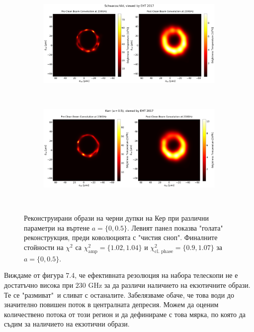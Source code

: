 \begin{figure}[h!]
	\centering
	\begin{subfigure}{12cm}
		\hspace{-1.5cm}
		\includegraphics[scale = 0.23]{Ehtim_plot_2017_no_blur_Sch.png}
	\end{subfigure}\\
	\begin{subfigure}{12cm}
		\hspace{-1.5cm}
		\includegraphics[scale = 0.23]{Ehtim_plot_2017_no_blur_Kerr.png}
	\end{subfigure}\\
	\label{Kerr_EHT_2017}
	\caption[Реконструирани образи на черни дупки на Кер при различни параметри на въртене от EHT 2017.]{\small Реконструирани образи на черни дупки на Кер при различни параметри на въртене $a = \{0, 0.5\}$. Левият панел показва "голата"$\,$ реконструкция, преди коволюцията с "чистия сноп". Финалните стойности на $\chi^2$ са $\chi^2_\text{amp} = \{1.02, 1.04\}$ и $\chi^2_\text{cl. phase} = \{0.9, 1.07\}$ за $a = \{0, 0.5\}$.} 
\end{figure}

\newpage

Виждаме от фигура 7.4, че ефективната резолюция на набора телескопи не е достатъчно висока при $230$ GHz за да различи наличието на екзотичните образи. Те се "размиват"$\,$ и сливат с останалите. Забелязваме обаче, че това води до значително повишен поток в централната депресия. Можем да оценим количествено потока от този регион и да дефинираме с това мярка, по която да съдим за наличието на екзотични образи. 


